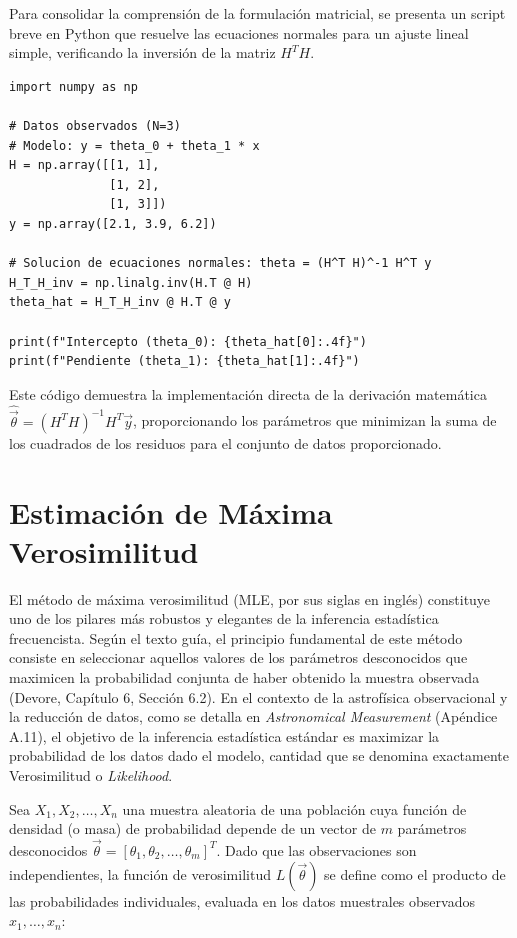 Para consolidar la comprensión de la formulación matricial, se presenta un script breve en Python que resuelve las ecuaciones normales para un ajuste lineal simple, verificando la inversión de la matriz $H^T H$.

\begin{verbatim}
import numpy as np

# Datos observados (N=3)
# Modelo: y = theta_0 + theta_1 * x
H = np.array([[1, 1], 
              [1, 2], 
              [1, 3]])
y = np.array([2.1, 3.9, 6.2])

# Solucion de ecuaciones normales: theta = (H^T H)^-1 H^T y
H_T_H_inv = np.linalg.inv(H.T @ H)
theta_hat = H_T_H_inv @ H.T @ y

print(f"Intercepto (theta_0): {theta_hat[0]:.4f}")
print(f"Pendiente (theta_1): {theta_hat[1]:.4f}")
\end{verbatim}

Este código demuestra la implementación directa de la derivación matemática $\hat{\vec{\theta}} = (H^T H)^{-1} H^T \vec{y}$, proporcionando los parámetros que minimizan la suma de los cuadrados de los residuos para el conjunto de datos proporcionado.

\section{Estimación de Máxima Verosimilitud}

El método de máxima verosimilitud (MLE, por sus siglas en inglés) constituye uno de los pilares más robustos y elegantes de la inferencia estadística frecuencista. Según el texto guía, el principio fundamental de este método consiste en seleccionar aquellos valores de los parámetros desconocidos que maximicen la probabilidad conjunta de haber obtenido la muestra observada (Devore, Capítulo 6, Sección 6.2). En el contexto de la astrofísica observacional y la reducción de datos, como se detalla en \textit{Astronomical Measurement} (Apéndice A.11), el objetivo de la inferencia estadística estándar es maximizar la probabilidad de los datos dado el modelo, cantidad que se denomina exactamente Verosimilitud o \textit{Likelihood}.

Sea $X_1, X_2, \dots, X_n$ una muestra aleatoria de una población cuya función de densidad (o masa) de probabilidad depende de un vector de $m$ parámetros desconocidos $\vec{\theta} = [\theta_1, \theta_2, \dots, \theta_m]^T$. Dado que las observaciones son independientes, la función de verosimilitud $L(\vec{\theta})$ se define como el producto de las probabilidades individuales, evaluada en los datos muestrales observados $x_1, \dots, x_n$:

